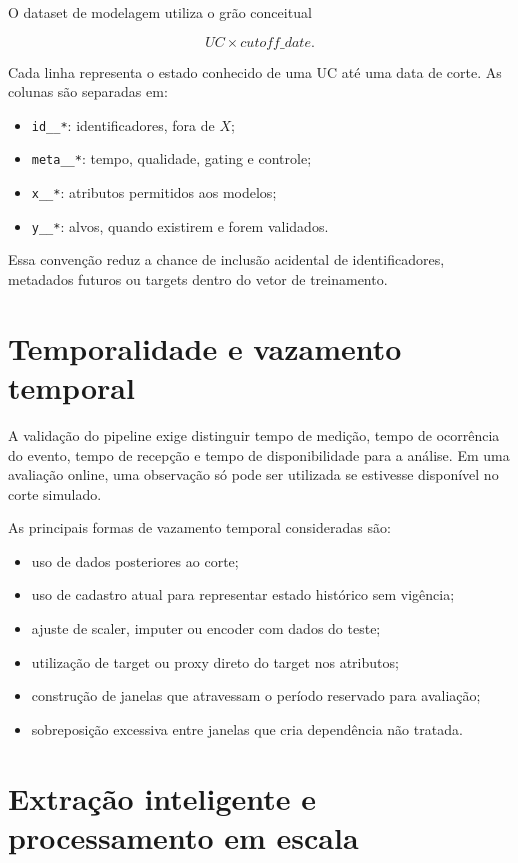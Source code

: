 O dataset de modelagem utiliza o grão conceitual

\[UC \times cutoff\_date.\]

Cada linha representa o estado conhecido de uma UC até uma data de corte. As colunas são separadas em:

\begin{itemize}
\item
  \texttt{id\_\_*}: identificadores, fora de \(X\);
\item
  \texttt{meta\_\_*}: tempo, qualidade, gating e controle;
\item
  \texttt{x\_\_*}: atributos permitidos aos modelos;
\item
  \texttt{y\_\_*}: alvos, quando existirem e forem validados.
\end{itemize}

Essa convenção reduz a chance de inclusão acidental de identificadores, metadados futuros ou targets dentro do vetor de treinamento.

\section{Temporalidade e vazamento temporal}\label{temporalidade-e-vazamento temporal}

A validação do pipeline exige distinguir tempo de medição, tempo de ocorrência do evento, tempo de recepção e tempo de disponibilidade para a análise. Em uma avaliação online, uma observação só pode ser utilizada se estivesse disponível no corte simulado.

As principais formas de vazamento temporal consideradas são:

\begin{itemize}
\item
  uso de dados posteriores ao corte;
\item
  uso de cadastro atual para representar estado histórico sem vigência;
\item
  ajuste de scaler, imputer ou encoder com dados do teste;
\item
  utilização de target ou proxy direto do target nos atributos;
\item
  construção de janelas que atravessam o período reservado para avaliação;
\item
  sobreposição excessiva entre janelas que cria dependência não tratada.
\end{itemize}

\section{Extração inteligente e processamento em escala}\label{extrauxe7uxe3o-inteligente-e-processamento-em-escala}

